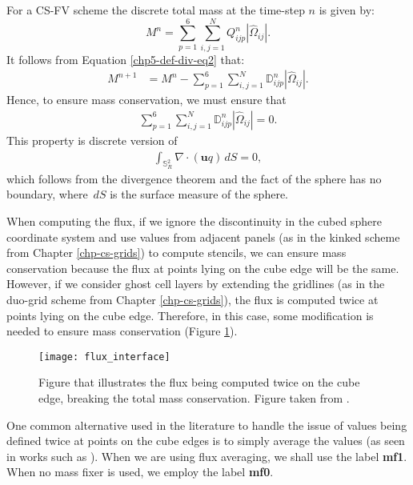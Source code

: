 For a CS-FV scheme the discrete total mass at the time-step $n$ is given by:
\begin{equation*}
	M^n =\sum_{p=1}^6 \sum_{i,j=1}^N Q_{ijp}^n |\hat{\Omega}_{ij}|.
\end{equation*}
It follows from Equation \eqref{chp5-def-div-eq2} that:
\begin{align*}
	M^{n+1} &= M^n  - \sum_{p=1}^6 \sum_{i,j=1}^N \mathbb{D}_{ijp}^{n} |\hat{\Omega}_{ij}|.
\end{align*}
Hence, to ensure mass conservation, we must ensure that
\begin{align*}
	\sum_{p=1}^6 \sum_{i,j=1}^N   \mathbb{D}_{ijp}^{n} |\hat{\Omega}_{ij}| = 0.
\end{align*}
This property is discrete version of
\begin{align*}
	\int_{\mathbb{S}^2_R} \nabla \cdot (\boldsymbol{u}q) \,dS = 0,
\end{align*}
which follows from the divergence theorem and the fact of the sphere has no boundary, where $\,dS$ is the surface measure of the sphere.

When computing the flux, if we ignore the discontinuity in the cubed sphere coordinate system and use values from adjacent panels
(as in the kinked scheme from Chapter \ref{chp-cs-grids}) to compute stencils, we can ensure mass conservation because the
flux at points lying on the cube edge will be the same.
However, if we consider ghost cell layers by extending the gridlines (as in the duo-grid scheme from Chapter \ref{chp-cs-grids}),
the flux is computed twice at points lying on the cube edge.
Therefore, in this case, some modification is needed to ensure mass conservation (Figure \ref{chp5-fluxcube}).
\begin{figure}[!htb]
	\centering
	\texttt{[image: flux\_interface]}
	\caption{Figure that illustrates the flux being computed twice on
		the cube edge, breaking the total mass conservation.
		Figure taken from \citet{ross:2006}.\label{chp5-fluxcube}}
\end{figure}
One common alternative used in the literature to handle the issue of values being defined twice at points on the
cube edges is to simply average the values (as seen in works such as \citet{ross:2006, chen:2008, chen:2021, mouallem:2023}).
When we are using flux averaging, we shall use the label \textbf{mf1}. When no mass fixer is used, we employ the label \textbf{mf0}.
 
